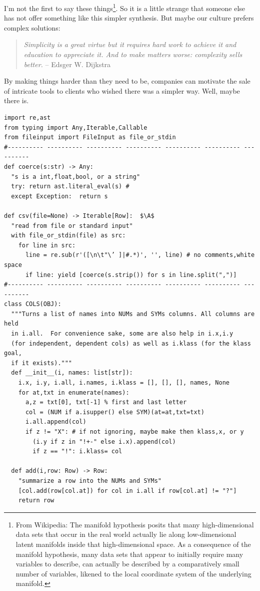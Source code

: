 \documentclass[landscape,	DIV=calc,%
							paper=letter,%
							fontsize=10pt,%
							twocolumn]{scrartcl}	 					%
\newcommand*\circled[1]{\tikz[baseline=(char.base)]{
            \node[minimum width=1pt, shape=circle,fill=black,inner sep=1pt] (char) {{\footnotesize \textcolor{white}{#1}}};}}
\newcommand{\A}{\circled{a}}
\begin{document}
I'm not the first to say these things\footnote{
From Wikipedia: The manifold hypothesis posits that many
high-dimensional data sets that occur in the real world actually
lie along low-dimensional latent manifolds inside that high-dimensional
space. As a consequence of the manifold hypothesis, many data sets
that appear to initially require many variables to describe, can
actually be described by a comparatively small number of variables,
likened to the local coordinate system of the underlying manifold.}.
So it is a little
strange that someone else has not offer something like this simpler
synthesis. But maybe our culture prefers complex solutions:

\begin{quote}{\em Simplicity is a great virtue but it requires hard work to achieve
it and education to appreciate it. And to make matters worse:
complexity sells better.}\newline
-- Edsger W. Dijkstra
\end{quote}

By making things harder than they need to be, companies can motivate
the sale  of intricate tools to clients who wished there was a
simpler way. Well, maybe there is.


\begin{table}[!t]{\linewidth}
\begin{lstlisting}[caption=Python example]
import re,ast
from typing import Any,Iterable,Callable
from fileinput import FileInput as file_or_stdin
#---------- ---------- ---------- ---------- ---------- ---------- ----------
def coerce(s:str) -> Any:
  "s is a int,float,bool, or a string"
  try: return ast.literal_eval(s) # 
  except Exception:  return s

def csv(file=None) -> Iterable[Row]:  $\A$
  "read from file or standard input"
  with file_or_stdin(file) as src: 
    for line in src:
      line = re.sub(r'([\n\t"\’ ]|#.*)', '', line) # no comments,white space
      if line: yield [coerce(s.strip()) for s in line.split(",")]
#---------- ---------- ---------- ---------- ---------- ---------- ----------
class COLS(OBJ): 
  """Turns a list of names into NUMs and SYMs columns. All columns are held 
  in i.all.  For convenience sake, some are also help in i.x,i.y 
  (for independent, dependent cols) as well as i.klass (for the klass goal, 
  if it exists)."""
  def __init__(i, names: list[str]): 
    i.x, i.y, i.all, i.names, i.klass = [], [], [], names, None
    for at,txt in enumerate(names):
      a,z = txt[0], txt[-1] % first and last letter
      col = (NUM if a.isupper() else SYM)(at=at,txt=txt)
      i.all.append(col)
      if z != "X": # if not ignoring, maybe make then klass,x, or y
        (i.y if z in "!+-" else i.x).append(col)
        if z == "!": i.klass= col

  def add(i,row: Row) -> Row: 
    "summarize a row into the NUMs and SYMs"
    [col.add(row[col.at]) for col in i.all if row[col.at] != "?"]
    return row
\end{lstlisting}
\end{table}
\end{document}
